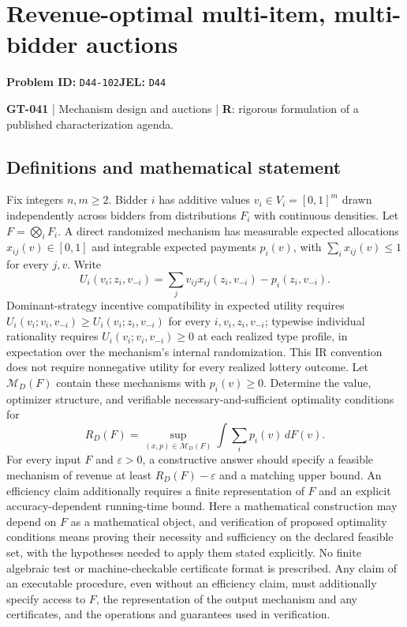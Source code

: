 \documentclass[11pt,a4paper]{article}
\begin{document}
\section*{Revenue-optimal multi-item, multi-bidder auctions}
\textbf{Problem ID:} \texttt{D44-102}\quad \textbf{JEL:} \texttt{D44}\par
\label{problem:OP-0171}
\label{game:GT-041}
{\sffamily\small\color{muted}
\textbf{GT-041} | Mechanism design and auctions | \textbf{R}: rigorous formulation of a published characterization agenda.
\par}
\subsection*{Definitions and mathematical statement}
Fix integers $n,m\geq2$. Bidder $i$ has additive values $v_i\in V_i=[0,1]^m$ drawn independently across bidders from distributions $F_i$ with continuous densities. Let $F=\bigotimes_i F_i$. A direct randomized mechanism has measurable expected allocations $x_{ij}(v)\in[0,1]$ and integrable expected payments $p_i(v)$, with $\sum_i x_{ij}(v)\leq1$ for every $j,v$. Write
\[
 U_i(v_i;z_i,v_{-i})=\sum_j v_{ij}x_{ij}(z_i,v_{-i})-p_i(z_i,v_{-i}).
\]
Dominant-strategy incentive compatibility in expected utility requires $U_i(v_i;v_i,v_{-i})\geq U_i(v_i;z_i,v_{-i})$ for every $i,v_i,z_i,v_{-i}$; typewise individual rationality requires $U_i(v_i;v_i,v_{-i})\geq0$ at each realized type profile, in expectation over the mechanism's internal randomization. This IR convention does not require nonnegative utility for every realized lottery outcome. Let $\mathcal M_D(F)$ contain these mechanisms with $p_i(v)\geq0$. Determine the value, optimizer structure, and verifiable necessary-and-sufficient optimality conditions for
\[
 R_D(F)=\sup_{(x,p)\in\mathcal M_D(F)}\int \sum_i p_i(v)\,dF(v).
\]
For every input $F$ and $\varepsilon>0$, a constructive answer should specify a feasible mechanism of revenue at least $R_D(F)-\varepsilon$ and a matching upper bound. An efficiency claim additionally requires a finite representation of $F$ and an explicit accuracy-dependent running-time bound. Here a mathematical construction may depend on $F$ as a mathematical object, and verification of proposed optimality conditions means proving their necessity and sufficiency on the declared feasible set, with the hypotheses needed to apply them stated explicitly. No finite algebraic test or machine-checkable certificate format is prescribed. Any claim of an executable procedure, even without an efficiency claim, must additionally specify access to $F$, the representation of the output mechanism and any certificates, and the operations and guarantees used in verification.
\end{document}

